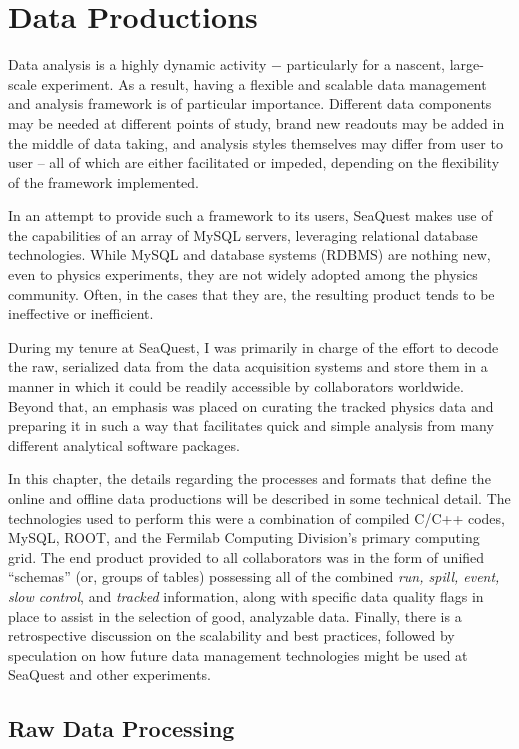 \chapter{Data Productions}

Data analysis is a highly dynamic activity $-$ particularly for a nascent, large-scale experiment. As a result, having a flexible and scalable data management and analysis framework is of particular importance. Different data components may be needed at different points of study, brand new readouts may be added in the middle of data taking, and analysis styles themselves may differ from user to user -- all of which are either facilitated or impeded, depending on the flexibility of the framework implemented.

In an attempt to provide such a framework to its users, SeaQuest makes use of the capabilities of an array of MySQL servers, leveraging relational database technologies. While MySQL and database systems (RDBMS) are nothing new, even to physics experiments, they are not widely adopted among the physics community. Often, in the cases that they are, the resulting product tends to be ineffective or inefficient. 

During my tenure at SeaQuest, I was primarily in charge of the effort to decode the raw, serialized data from the data acquisition systems and store them in a manner in which it could be readily accessible by collaborators worldwide. Beyond that, an emphasis was placed on curating the tracked physics data and preparing it in such a way that facilitates quick and simple analysis from many different analytical software packages. 

In this chapter, the details regarding the processes and formats that define the online and offline data productions will be described in some technical detail. The technologies used to perform this were a combination of compiled C/C++ codes, MySQL, ROOT, and the Fermilab Computing Division's primary computing grid. The end product provided to all collaborators was in the form of unified ``schemas'' (or, groups of tables) possessing all of the combined \emph{run, spill, event, slow control}, and \emph{tracked} information, along with specific data quality flags in place to assist in the selection of good, analyzable data. Finally, there is a retrospective discussion on the scalability and best practices, followed by speculation on how future data management technologies might be used at SeaQuest and other experiments.

\section{Raw Data Processing}

